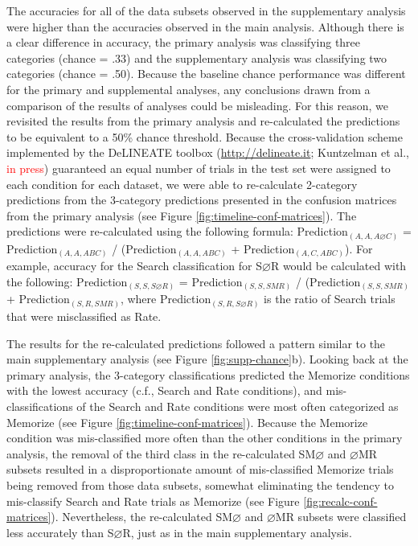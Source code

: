 \documentclass[
  english,
  man, donotrepeattitle,floatsintext]{apa6}
\begin{document}
The accuracies for all of the data subsets observed in the supplementary analysis were higher than the accuracies observed in the main analysis. Although there is a clear difference in accuracy, the primary analysis was classifying three categories (chance = .33) and the supplementary analysis was classifying two categories (chance = .50). Because the baseline chance performance was different for the primary and supplemental analyses, any conclusions drawn from a comparison of the results of analyses could be misleading. For this reason, we revisited the results from the primary analysis and re-calculated the predictions to be equivalent to a 50\% chance threshold. Because the cross-validation scheme implemented by the DeLINEATE toolbox (\url{http://delineate.it}; Kuntzelman et al., \textcolor{red}{in press}) guaranteed an equal number of trials in the test set were assigned to each condition for each dataset, we were able to re-calculate 2-category predictions from the 3-category predictions presented in the confusion matrices from the primary analysis (see Figure \ref{fig:timeline-conf-matrices}). The predictions were re-calculated using the following formula: Prediction\(_{(A, A, A\varnothing C)}\) = Prediction\(_{(A, A, ABC)}\) / (Prediction\(_{(A, A, ABC)}\) + Prediction\(_{(A, C, ABC)}\)). For example, accuracy for the Search classification for S\(\varnothing\)R would be calculated with the following: Prediction\(_{(S, S, S\varnothing R)}\) = Prediction\(_{(S, S, SMR)}\) / (Prediction\(_{(S, S, SMR)}\) + Prediction\(_{(S, R, SMR)}\), where Prediction\(_{(S, R, S\varnothing R)}\) is the ratio of Search trials that were misclassified as Rate.

The results for the re-calculated predictions followed a pattern similar to the main supplementary analysis (see Figure \ref{fig:supp-chance}b). Looking back at the primary analysis, the 3-category classifications predicted the Memorize conditions with the lowest accuracy (c.f., Search and Rate conditions), and mis-classifications of the Search and Rate conditions were most often categorized as Memorize (see Figure \ref{fig:timeline-conf-matrices}). Because the Memorize condition was mis-classified more often than the other conditions in the primary analysis, the removal of the third class in the re-calculated SM\(\varnothing\) and \(\varnothing\)MR subsets resulted in a disproportionate amount of mis-classified Memorize trials being removed from those data subsets, somewhat eliminating the tendency to mis-classify Search and Rate trials as Memorize (see Figure \ref{fig:recalc-conf-matrices}). Nevertheless, the re-calculated SM\(\varnothing\) and \(\varnothing\)MR subsets were classified less accurately than S\(\varnothing\)R, just as in the main supplementary analysis.
\end{document}
